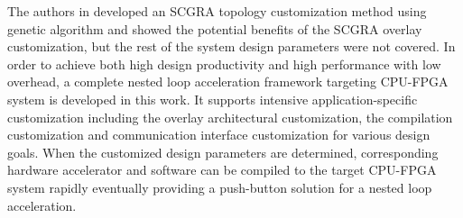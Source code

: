 The authors in \cite{colinheart} developed an SCGRA topology customization method using 
genetic algorithm and showed the potential benefits of the SCGRA overlay customization, 
but the rest of the system design parameters were not covered.
In order to achieve both high design productivity and high performance with low overhead,  
a complete nested loop acceleration framework targeting CPU-FPGA system 
is developed in this work. It supports intensive application-specific
customization including the overlay architectural customization, 
the compilation customization and communication interface customization 
for various design goals. When the customized design parameters are determined, 
corresponding hardware accelerator and software can be compiled to the target 
CPU-FPGA system rapidly eventually providing a push-button solution for a nested loop 
acceleration. 
